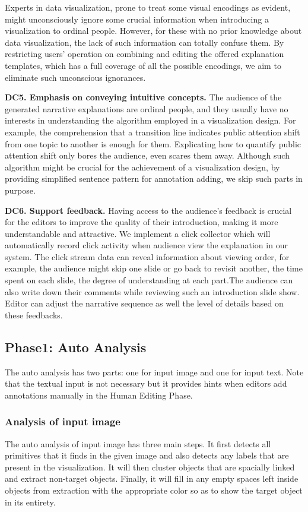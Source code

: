 Experts in data visualization, prone to treat some visual encodings as evident, might unconsciously ignore some crucial information when introducing a visualization to ordinal people. However, for these with no prior knowledge about data visualization, the lack of such information can totally confuse them. By restricting users' operation on combining and editing the offered explanation templates, which has a full coverage of all the possible encodings, we aim to eliminate such unconscious ignorances.   \par
\textbf{DC5. Emphasis on conveying intuitive concepts.} The audience of the generated narrative explanations are ordinal people, and they usually have no interests in understanding the algorithm employed in a visualization design. For example, the comprehension that a transition line indicates public attention shift from one topic to another is enough for them. Explicating how to quantify public attention shift only bores the audience, even scares them away. Although such algorithm might be crucial for the achievement of a visualization design, by providing simplified sentence pattern for annotation adding, we skip such parts in purpose.

\textbf{DC6. Support feedback.} Having access to the audience's feedback is crucial for the editors to improve  the quality of their introduction, making it more understandable and attractive.  We implement a click collector which will automatically record click activity when audience view the explanation in our system. The click stream data can reveal information about viewing order, for example, the audience might skip one slide or go back to revisit another, the time spent on each slide, the degree of understanding at each part.The audience can also write down their comments while reviewing such an introduction slide show. Editor can adjust the narrative sequence as well the level of details based on these feedbacks. 
\subsection{Phase1: Auto Analysis}\par
The auto analysis has two parts: one for input image and one for input text. Note that the textual input is not necessary but it provides hints when editors add annotations manually in the Human Editing Phase.
 \subsubsection{Analysis of input image}
The auto analysis of input image has three main steps. It first detects all primitives that it finds in the given image and also detects any labels that are present in the visualization. It will then cluster objects that are spacially linked and extract non-target objects. Finally, it will fill in any empty spaces left inside objects from extraction with the appropriate color so as to show the target object in its entirety.

